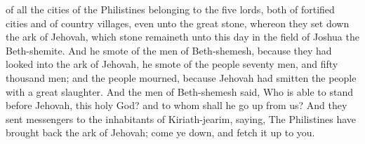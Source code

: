 of all the cities of the Philistines belonging to the five lords, both of fortified cities and of country villages, even unto the great stone, whereon they set down the ark of Jehovah, which stone remaineth unto this day in the field of Joshua the Beth-shemite.  And he smote of the men of Beth-shemesh, because they had looked into the ark of Jehovah, he smote of the people seventy men, and fifty thousand men; and the people mourned, because Jehovah had smitten the people with a great slaughter. And the men of Beth-shemesh said, Who is able to stand before Jehovah, this holy God? and to whom shall he go up from us? And they sent messengers to the inhabitants of Kiriath-jearim, saying, The Philistines have brought back the ark of Jehovah; come ye down, and fetch it up to you. 

